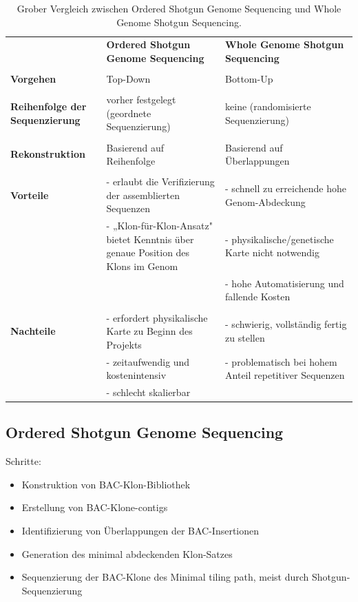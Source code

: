 \begin{table}[H]
 \centering
\begin{tabular}{p{3cm}p{6cm}p{6cm}} 
     & \textbf{Ordered Shotgun Genome Sequencing} & \textbf{Whole Genome Shotgun Sequencing} \\ \\
    \textbf{Vorgehen} & Top-Down & Bottom-Up \\ \\
    \textbf{Reihenfolge der Sequenzierung} & vorher festgelegt (geordnete Sequenzierung) & keine (randomisierte Sequenzierung) \\ \\ 
    \textbf{Rekonstruktion} & Basierend auf Reihenfolge & Basierend auf Überlappungen \\ \\
    \textbf{Vorteile} & - erlaubt die Verifizierung der assemblierten Sequenzen & - schnell zu erreichende hohe Genom-Abdeckung \\
    & - „Klon-für-Klon-Ansatz" bietet Kenntnis über genaue Position des Klons im Genom & - physikalische/genetische Karte nicht notwendig \\
    & & - hohe Automatisierung und fallende Kosten \\ \\
    \textbf{Nachteile} & - erfordert physikalische Karte zu Beginn des Projekts & - schwierig, vollständig fertig zu stellen \\
    & - zeitaufwendig und kostenintensiv & - problematisch bei hohem Anteil repetitiver Sequenzen \\
    & - schlecht skalierbar & \\
\end{tabular}
    \caption{Grober Vergleich zwischen Ordered Shotgun Genome Sequencing und Whole Genome Shotgun Sequencing.}
    \label{tab:vergleichwholeundordered}
\end{table}  
\subsection{Ordered Shotgun Genome Sequencing}
Schritte:
\begin{itemize}
    \item Konstruktion von BAC-Klon-Bibliothek 
    \item Erstellung von BAC-Klone-\glspl{contig}
    \item Identifizierung von Überlappungen der BAC-Insertionen
    \item Generation des minimal abdeckenden Klon-Satzes
    \item Sequenzierung der BAC-Klone des Minimal tiling path, meist durch Shotgun-Sequenzierung
\end{itemize}
